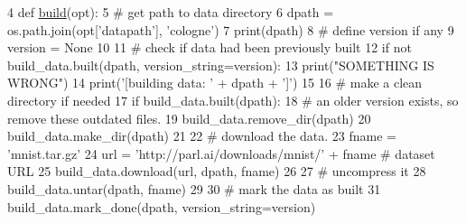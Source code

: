 \begin{DoxyCode}
4 \textcolor{keyword}{def }\hyperlink{namespacedialog__babi__feedback_1_1build_a7a9d289f7493a5ded13c4b7f071b6184}{build}(opt):
5     \textcolor{comment}{# get path to data directory}
6     dpath = os.path.join(opt[\textcolor{stringliteral}{'datapath'}], \textcolor{stringliteral}{'cologne'})
7     print(dpath)
8     \textcolor{comment}{# define version if any}
9     version = \textcolor{keywordtype}{None}
10 
11     \textcolor{comment}{# check if data had been previously built}
12     \textcolor{keywordflow}{if} \textcolor{keywordflow}{not} build\_data.built(dpath, version\_string=version):
13         print(\textcolor{stringliteral}{"SOMETHING IS WRONG"})
14         print(\textcolor{stringliteral}{'[building data: '} + dpath + \textcolor{stringliteral}{']'})
15 
16         \textcolor{comment}{# make a clean directory if needed}
17         \textcolor{keywordflow}{if} build\_data.built(dpath):
18             \textcolor{comment}{# an older version exists, so remove these outdated files.}
19             build\_data.remove\_dir(dpath)
20         build\_data.make\_dir(dpath)
21 
22         \textcolor{comment}{# download the data.}
23         fname = \textcolor{stringliteral}{'mnist.tar.gz'}
24         url = \textcolor{stringliteral}{'http://parl.ai/downloads/mnist/'} + fname \textcolor{comment}{# dataset URL}
25         build\_data.download(url, dpath, fname)
26 
27         \textcolor{comment}{# uncompress it}
28         build\_data.untar(dpath, fname)
29 
30         \textcolor{comment}{# mark the data as built}
31         build\_data.mark\_done(dpath, version\_string=version)
\end{DoxyCode}
